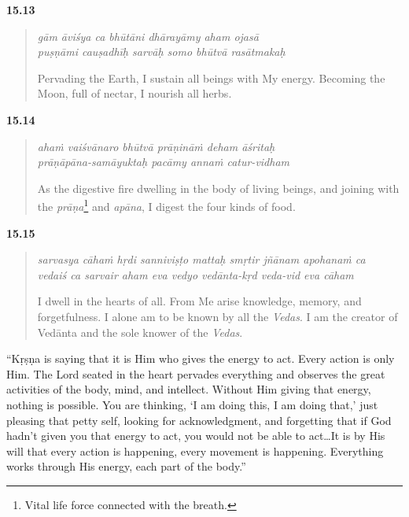 \par\noindent\textbf{15.13}\par
\begin{verse}
\textit{gām āviśya ca bhūtāni dhārayāmy aham ojasā} \\
\textit{puṣṇāmi cauṣadhīḥ sarvāḥ somo bhūtvā rasātmakaḥ}

\noindent Pervading the Earth, I sustain all beings with My energy. Becoming the Moon, full of nectar, I nourish all herbs.
\end{verse}
\par



\par\noindent\textbf{15.14}\par
\begin{verse}
\textit{ahaṁ vaiśvānaro bhūtvā prāṇināṁ deham āśritaḥ} \\
\textit{prāṇāpāna-samāyuktaḥ pacāmy annaṁ catur-vidham}

\noindent As the digestive fire dwelling in the body of living beings, and joining with the \textit{prāṇa}\footnote{Vital life force connected with the breath.} and \textit{apāna}, I digest the four kinds of food.
\end{verse}
\par



\par\noindent\textbf{15.15}\par
\begin{verse}
\textit{sarvasya cāhaṁ hṛdi sanniviṣṭo mattaḥ smṛtir jñānam apohanaṁ ca} \\
\textit{vedaiś ca sarvair aham eva vedyo vedānta-kṛd veda-vid eva cāham}

\noindent I dwell in the hearts of all. From Me arise knowledge, memory, and forgetfulness. I alone am to be known by all the \textit{Vedas}. I am the creator of Vedānta and the sole knower of the \textit{Vedas}.
\end{verse}
\par


\enquote{Kṛṣṇa is saying that it is Him who gives the energy to act. Every action is only Him. The Lord seated in the heart pervades everything and observes the great activities of the body, mind, and intellect. Without Him giving that energy, nothing is possible. You are thinking, \enquote{I am doing this, I am doing that,} just pleasing that petty self, looking for acknowledgment, and forgetting that if God hadn’t given you that energy to act, you would not be able to act\ldots It is by His will that every action is happening, every movement is happening. Everything works through His energy, each part of the body.}

